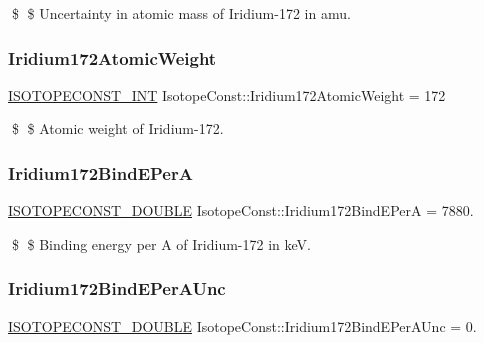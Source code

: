 \$ \$ Uncertainty in atomic mass of Iridium-\/172 in amu. \mbox{\label{group___isotope_const-_iridium-_ir172_ga9399363ca97b0a662b516ac5cd4870ca}} 
\subsubsection{\texorpdfstring{Iridium172\+Atomic\+Weight}{Iridium172AtomicWeight}}
{\footnotesize\ttfamily \mbox{\hyperlink{group___isotope_const-_macros_ga5f18360b3e99483a35c32d789e62621c}{I\+S\+O\+T\+O\+P\+E\+C\+O\+N\+S\+T\+\_\+\+I\+NT}} Isotope\+Const\+::\+Iridium172\+Atomic\+Weight = 172}

\$ \$ Atomic weight of Iridium-\/172. \mbox{\label{group___isotope_const-_iridium-_ir172_ga01673ba6924705f7636f50cf19838f66}} 
\subsubsection{\texorpdfstring{Iridium172\+Bind\+E\+PerA}{Iridium172BindEPerA}}
{\footnotesize\ttfamily \mbox{\hyperlink{group___isotope_const-_macros_ga8f45a7272ce02c0b4c65c44636ed719a}{I\+S\+O\+T\+O\+P\+E\+C\+O\+N\+S\+T\+\_\+\+D\+O\+U\+B\+LE}} Isotope\+Const\+::\+Iridium172\+Bind\+E\+PerA = 7880.}

\$ \$ Binding energy per A of Iridium-\/172 in keV. \mbox{\label{group___isotope_const-_iridium-_ir172_ga1479ded844cca6d3e144681bbcbc2c22}} 
\subsubsection{\texorpdfstring{Iridium172\+Bind\+E\+Per\+A\+Unc}{Iridium172BindEPerAUnc}}
{\footnotesize\ttfamily \mbox{\hyperlink{group___isotope_const-_macros_ga8f45a7272ce02c0b4c65c44636ed719a}{I\+S\+O\+T\+O\+P\+E\+C\+O\+N\+S\+T\+\_\+\+D\+O\+U\+B\+LE}} Isotope\+Const\+::\+Iridium172\+Bind\+E\+Per\+A\+Unc = 0.}

